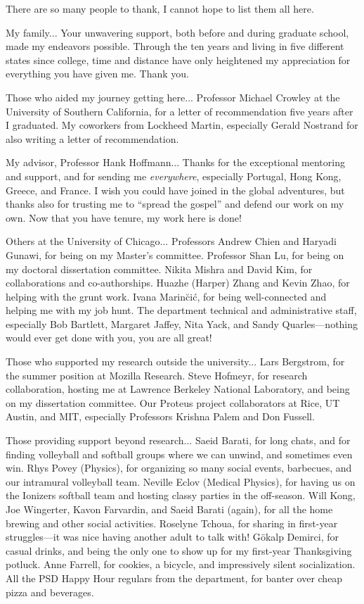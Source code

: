 There are so many people to thank, I cannot hope to list them all here.

My family...
Your unwavering support, both before and during graduate school, made my endeavors possible.
Through the ten years and living in five different states since college, time and distance have only heightened my appreciation for everything you have given me.
Thank you.

Those who aided my journey getting here...
Professor Michael Crowley at the University of Southern California, for a letter of recommendation five years after I graduated.
My coworkers from Lockheed Martin, especially Gerald Nostrand for also writing a letter of recommendation. %

My advisor, Professor Hank Hoffmann...
Thanks for the exceptional mentoring and support, and for sending me \emph{everywhere}, especially Portugal, Hong Kong, Greece, and France.
I wish you could have joined in the global adventures, but thanks also for trusting me to ``spread the gospel'' and defend our work on my own.
Now that you have tenure, my work here is done!

Others at the University of Chicago...
Professors Andrew Chien and Haryadi Gunawi, for being on my Master's committee.
Professor Shan Lu, for being on my doctoral dissertation committee.
Nikita Mishra and David Kim, for collaborations and co-authorships.
Huazhe (Harper) Zhang and Kevin Zhao, for helping with the grunt work.
Ivana Marin{\u c}i{\'c}, for being well-connected and helping me with my job hunt.
The department technical and administrative staff, especially Bob Bartlett, Margaret Jaffey, Nita Yack, and Sandy Quarles---nothing would ever get done with you, you are all great!

Those who supported my research outside the university...
Lars Bergstrom, for the summer position at Mozilla Research.
Steve Hofmeyr, for research collaboration, hosting me at Lawrence Berkeley National Laboratory, and being on my dissertation committee.
Our Proteus project collaborators at Rice, UT Austin, and MIT, especially Professors Krishna Palem and Don Fussell.

Those providing support beyond research...
Saeid Barati, for long chats, and for finding volleyball and softball groups where we can unwind, and sometimes even win.
Rhys Povey (Physics), for organizing so many social events, barbecues, and our intramural volleyball team.
Neville Eclov (Medical Physics), for having us on the Ionizers softball team and hosting classy parties in the off-season.
Will Kong, Joe Wingerter, Kavon Farvardin, and Saeid Barati (again), for all the home brewing and other social activities.
Roselyne Tchoua, for sharing in first-year struggles---it was nice having another adult to talk with!
G{\"o}kalp Demirci, for casual drinks, and being the only one to show up for my first-year Thanksgiving potluck.
Anne Farrell, for cookies, a bicycle, and impressively silent socialization.
All the PSD Happy Hour regulars from the department, for banter over cheap pizza and beverages.

